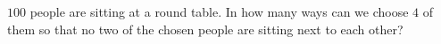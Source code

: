 $100$ people are sitting at a round table. In how many ways can we choose $4$ of them so that no two of the chosen people are sitting next to each other?
